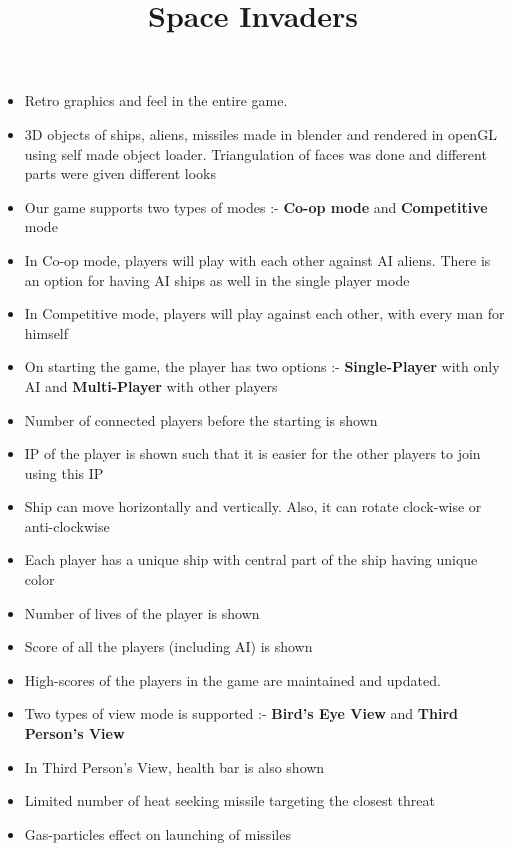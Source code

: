 \documentclass[12pt]{article}
\begin{document}
\title{Space Invaders}
\author{}
\date{}
\maketitle

\thispagestyle{empty}
\pagestyle{empty}

\begin{itemize}
	\item Retro graphics and feel in the entire game.
	\item 3D objects of ships, aliens, missiles made in blender and rendered in openGL using self made object loader. Triangulation of faces was done and different parts were given different looks
	\item Our game supports two types of modes :- \textbf{Co-op mode} and \textbf{Competitive} mode
	\item In Co-op mode, players will play with each other against AI aliens. There is an option for having AI ships as well in the single player mode
	\item In Competitive mode, players will play against each other, with every man for himself
	\item On starting the game, the player has two options :- \textbf{Single-Player} with only AI and \textbf{Multi-Player} with other players
	\item Number of connected players before the starting is shown
	\item IP of the player is shown such that it is easier for the other players to join using this IP
	\item Ship can move horizontally and vertically. Also, it can rotate clock-wise or anti-clockwise
	\item Each player has a unique ship with central part of the ship having unique color
	\item Number of lives of the player is shown
	\item Score of all the players (including AI) is shown
	\item High-scores of the players in the game are maintained and updated. 
	\item Two types of view mode is supported :- \textbf{Bird's Eye View} and \textbf{Third Person's View}
	\item In Third Person's View, health bar is also shown
	\item Limited number of heat seeking missile targeting the closest threat
	\item Gas-particles effect on launching of missiles

\end{itemize}
\end{document}
